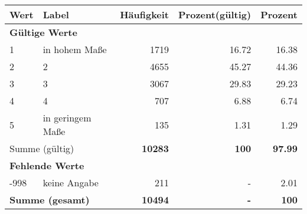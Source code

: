      \begin{longtable}{lXrrr}
     \toprule
     \textbf{Wert} & \textbf{Label} & \textbf{Häufigkeit} & \textbf{Prozent(gültig)} & \textbf{Prozent} \\
     \endhead
     \midrule
     \multicolumn{5}{l}{\textbf{Gültige Werte}}\\

     1 &
     \multicolumn{1}{X}{ in hohem Maße   } &


       \num{1719} &
       \num[round-mode=places,round-precision=2]{16.72} &
         \num[round-mode=places,round-precision=2]{16.38} \\

     2 &
     \multicolumn{1}{X}{ 2   } &


       \num{4655} &
       \num[round-mode=places,round-precision=2]{45.27} &
         \num[round-mode=places,round-precision=2]{44.36} \\

     3 &
     \multicolumn{1}{X}{ 3   } &


       \num{3067} &
       \num[round-mode=places,round-precision=2]{29.83} &
         \num[round-mode=places,round-precision=2]{29.23} \\

     4 &
     \multicolumn{1}{X}{ 4   } &


       \num{707} &
       \num[round-mode=places,round-precision=2]{6.88} &
         \num[round-mode=places,round-precision=2]{6.74} \\

     5 &
     \multicolumn{1}{X}{ in geringem Maße   } &


       \num{135} &
       \num[round-mode=places,round-precision=2]{1.31} &
         \num[round-mode=places,round-precision=2]{1.29} \\
     \midrule
     \multicolumn{2}{l}{Summe (gültig)} &
       \textbf{\num{10283}} &
     \textbf{\num{100}} &
       \textbf{\num[round-mode=places,round-precision=2]{97.99}} \\
     \multicolumn{5}{l}{\textbf{Fehlende Werte}}\\
       -998 &
       keine Angabe &
         \num{211} &
        - &
         \num[round-mode=places,round-precision=2]{2.01} \\
     \midrule
     \multicolumn{2}{l}{\textbf{Summe (gesamt)}} &
          \textbf{\num{10494}} &
        \textbf{-} &
        \textbf{\num{100}} \\
     \bottomrule
     \end{longtable}
     
